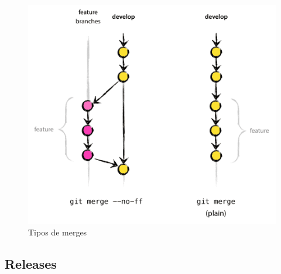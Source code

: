 \documentclass[12pt,openright,oneside,a4paper,english,brazil]{abntex2}
\begin{document}
\begin{figure}[H]
	\caption{\label{feature-merges}Tipos de merges}
	\begin{center}
		\includegraphics[width=0.6\linewidth]{feature-merges}
	\end{center}
\end{figure}

\subsection{Releases}

%
%
	 		
\end{document}
